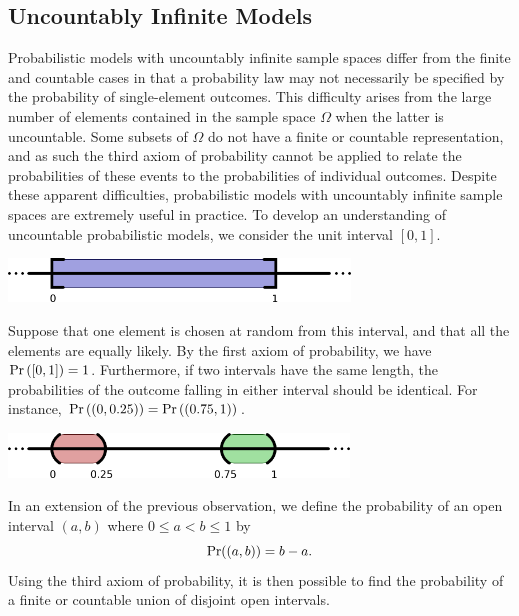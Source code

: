 \subsection{Uncountably Infinite Models}

Probabilistic models with uncountably infinite sample spaces differ from the finite and countable cases in that a probability law may not necessarily be specified by the probability of single-element outcomes.
This difficulty arises from the large number of elements contained in the sample space $\Omega$ when the latter is uncountable.
Some subsets of $\Omega$ do not have a finite or countable representation, and as such the third axiom of probability cannot be applied to relate the probabilities of these events to the probabilities of individual outcomes.
Despite these apparent difficulties, probabilistic models with uncountably infinite sample spaces are extremely useful in practice.
To develop an understanding of uncountable probabilistic models, we consider the unit interval $[0, 1]$.

\begin{center}
\includegraphics[height=1.17cm]{Figures/2Chapter/uncountablespace}
\end{center}

Suppose that one element is chosen at random from this interval, and that all the elements are equally likely.
By the first axiom of probability, we have $\Pr \left( [0,1] \right) = 1$.
Furthermore, if two intervals have the same length, the probabilities of the outcome falling in either interval should be identical.
For instance,
$\Pr \left( \left( 0, 0.25 \right) \right)
= \Pr \left( \left( 0.75, 1 \right) \right)$.

\begin{center}
\includegraphics[height=1.18cm]{Figures/2Chapter/intervals}
\end{center}

In an extension of the previous observation, we define the probability of an open interval $(a, b)$ where $0 \leq a < b \leq 1$ by
\begin{equation} \label{equation:DefinitionProbabilityLaw1}
\Pr ( (a,b) ) = b - a .
\end{equation}
Using the third axiom of probability, it is then possible to find the probability of a finite or countable union of disjoint open intervals.

